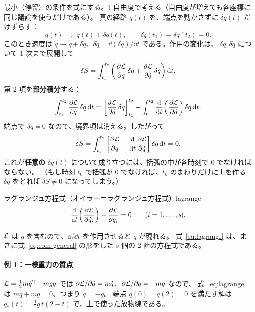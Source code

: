 最小（停留）の条件を式にする。1 自由度で考える（自由度が増えても各座標に同じ議論を使うだけである）。
真の経路 $q(t)$ を、端点を動かさずに $\delta q(t)$ だけずらす：
\begin{equation}
  q(t)\ \to\ q(t)+\delta q(t),\qquad \delta q(t_1)=\delta q(t_2)=0.
\end{equation}
このとき速度は $\dot q\to\dot q+\delta\dot q$、$\delta\dot q=\dd(\delta q)/\dd t$ である。作用の変化は、
$\delta q,\delta\dot q$ について 1 次まで展開して
\begin{equation}
  \delta S=\int_{t_1}^{t_2}\left(\frac{\partial \mathcal{L}}{\partial q}\,\delta q+\frac{\partial \mathcal{L}}{\partial \dot q}\,\delta\dot q\right)\mathrm{d} t.
\end{equation}
第 2 項を\textbf{部分積分}する：
\begin{equation}
  \int_{t_1}^{t_2}\frac{\partial \mathcal{L}}{\partial \dot q}\,\delta\dot q\,\mathrm{d} t
  =\left[\frac{\partial \mathcal{L}}{\partial \dot q}\,\delta q\right]_{t_1}^{t_2}-\int_{t_1}^{t_2}\frac{\mathrm{d} }{\mathrm{d} t}\!\left(\frac{\partial \mathcal{L}}{\partial \dot q}\right)\delta q\,\mathrm{d} t.
\end{equation}
端点で $\delta q=0$ なので、境界項は消える。したがって
\begin{equation}
  \delta S=\int_{t_1}^{t_2}\left[\frac{\partial \mathcal{L}}{\partial q}-\frac{\mathrm{d} }{\mathrm{d} t}\frac{\partial \mathcal{L}}{\partial \dot q}\right]\delta q\,\mathrm{d} t=0.
\end{equation}
これが\textbf{任意の} $\delta q(t)$ について成り立つには、括弧の中が各時刻で 0 でなければならない。
（もし時刻 $t_0$ で括弧が 0 でなければ、$t_0$ のまわりだけに山を作る $\delta q$ をとれば $\delta S\ne0$ になってしまう。）

\begin{result}{ラグランジュ方程式（オイラー＝ラグランジュ方程式）}{lagrange}
\begin{equation}
  \frac{\mathrm{d} }{\mathrm{d} t}\!\left(\frac{\partial \mathcal{L}}{\partial \dot q_i}\right)-\frac{\partial \mathcal{L}}{\partial q_i}=0\qquad(i=1,\dots,s).
  \label{eq:lagrange}
\end{equation}
\end{result}

$\mathcal{L}$ は $\dot q$ を含むので、$\dd/\dd t$ を作用させると $\ddot q$ が現れる。
式~\eqref{eq:lagrange} は、まさに式~\eqref{eq:eom-general} の形をした $s$ 個の 2 階の方程式である。

\paragraph{例 1：一様重力の質点}
$\mathcal{L}=\tfrac12m\dot q^2-mgq$ では $\partial\mathcal{L}/\partial\dot q=m\dot q$、$\partial\mathcal{L}/\partial q=-mg$ なので、
式~\eqref{eq:lagrange} は $m\ddot q+mg=0$、つまり $\ddot q=-g$。
端点 $q(0)=q(2)=0$ を満たす解は $q_*(t)=\tfrac12g\,t(2-t)$ で、上で使った放物線である。

